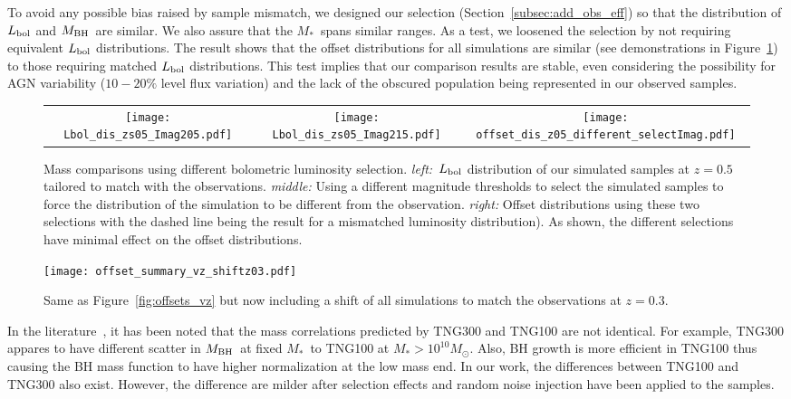 \documentclass[twocolumn]{aastex631}
\def\smass{{$M_*$}}
\def\mbh{$M_{\rm BH}$}
\begin{document}
To avoid any possible bias raised by sample mismatch, we designed our selection (Section~\ref{subsec:add_obs_eff}) so that the distribution of $L_{\rm bol}$ and \mbh\ are similar. We also assure that the \smass\ spans similar ranges. As a test, we loosened the selection by not requiring equivalent $L_{\rm bol}$ distributions. The result shows that the offset distributions for all simulations are similar (see demonstrations in Figure~\ref{fig:offsets_nochange}) to those requiring matched $L_{\rm bol}$ distributions. This test implies that our comparison results are stable, even considering the possibility for AGN variability ($10-20\%$ level flux variation) and the lack of the obscured population being represented in our observed samples.

\begin{figure*}
\centering
\begin{tabular}{c c c}
\hspace*{-0.4cm} 
{\texttt{[image: Lbol\_dis\_zs05\_Imag205.pdf]}}&
\hspace*{-0.4cm} 
{\texttt{[image: Lbol\_dis\_zs05\_Imag215.pdf]}}&
\hspace*{-0.4cm} 
{\texttt{[image: offset\_dis\_z05\_different\_selectImag.pdf]}}\\
\end{tabular}
\caption{\label{fig:offsets_nochange} 
Mass comparisons using different bolometric luminosity selection. {\it left:}~$L_{\rm bol}$ distribution of our simulated samples at $z=0.5$ tailored to match with the observations. {\it middle:} Using a different magnitude thresholds to select the simulated samples to force the distribution of the simulation to be different from the observation.  {\it right:} Offset distributions using these two selections with the dashed line being the result for a mismatched luminosity distribution). As shown, the different selections have minimal effect on the offset distributions.
}
\end{figure*} 


\begin{figure}
\centering
\texttt{[image: offset\_summary\_vz\_shiftz03.pdf]}
\caption{\label{fig:offsets_vz_shiftz03} 
Same as Figure~\ref{fig:offsets_vz} but now including a shift of all simulations to match the observations at $z=0.3$.
}
\end{figure} 

In the literature~\citep{Weinberger2018, Habouzit2021}, it has been noted that the mass correlations predicted by TNG300 and TNG100 are not identical. For example, TNG300 appares to have different scatter in \mbh\ at fixed \smass\ to TNG100 at \smass $>10^{10}M_{\odot}$. Also, BH growth is more efficient in TNG100 thus causing the BH mass function to have higher normalization at the low mass end. In our work, the differences between TNG100 and TNG300 also exist. However, the difference are milder after selection effects and random noise injection have been applied to the samples.
\end{document}
